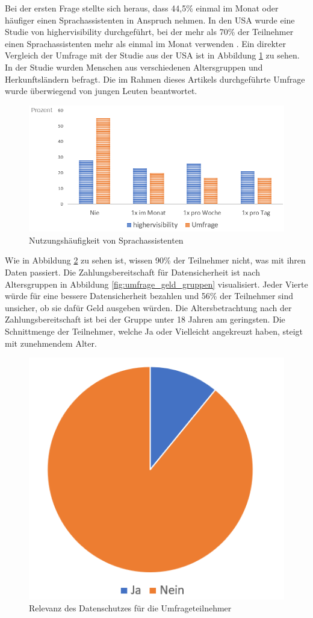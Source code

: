 Bei der ersten Frage stellte sich heraus, dass 44,5\% einmal im Monat oder häufiger einen Sprachassistenten in Anspruch nehmen. In den USA wurde eine Studie von \glqq highervisibility\grqq{} durchgeführt, bei der mehr als 70\% der Teilnehmer einen Sprachassistenten mehr als einmal im Monat verwenden \cite{highervisibility}.
Ein direkter Vergleich der Umfrage mit der Studie aus der USA ist in Abbildung \ref{fig:umfrage_haeufigkeit} zu sehen. In der Studie wurden Menschen aus verschiedenen Altersgruppen und Herkunftsländern befragt. Die im Rahmen dieses Artikels durchgeführte Umfrage wurde überwiegend von jungen Leuten beantwortet.

\begin{figure}[!h]
	\centering
	\includegraphics[width=0.9\linewidth]{Picture/umfrage_haeufigkeit}
	\caption[Nutzungshäufigkeit von Sprachassistenten]{Nutzungshäufigkeit von Sprachassistenten}
	\label{fig:umfrage_haeufigkeit}
\end{figure} 

Wie in Abbildung \ref{fig:umfrage_datenschutz} zu sehen ist, wissen 90\% der Teilnehmer nicht, was mit ihren Daten passiert. Die Zahlungsbereitschaft für Datensicherheit ist nach Altersgruppen in Abbildung \ref{fig:umfrage_geld_gruppen} visualisiert. Jeder Vierte würde für eine bessere Datensicherheit bezahlen und 56\% der Teilnehmer sind unsicher, ob sie dafür Geld ausgeben würden. Die Altersbetrachtung nach der Zahlungsbereitschaft ist bei der Gruppe unter 18 Jahren am geringsten. Die Schnittmenge der Teilnehmer, welche \glqq Ja\grqq{} oder \glqq Vielleicht\grqq{} angekreuzt haben, steigt mit zunehmendem Alter.

\begin{figure}[!h]
	\centering
	\includegraphics[width=0.5\linewidth]{Picture/umfrage_datenschutz}
	\caption[Relevanz des Datenschutzes für die Umfrageteilnehmer]{Relevanz des Datenschutzes für die Umfrageteilnehmer}
	\label{fig:umfrage_datenschutz}
\end{figure}

